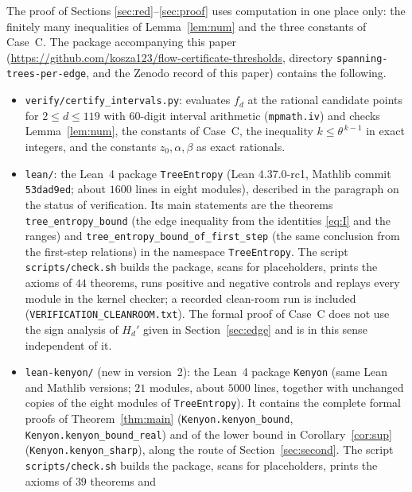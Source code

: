 \documentclass[11pt]{amsart}
\theoremstyle{plain}
\theoremstyle{remark}
\newcommand{\code}[1]{\texttt{#1}}
\newcommand{\tht}{\theta}
\begin{document}
The proof of Sections \ref{sec:red}--\ref{sec:proof} uses computation in one place only: the finitely many
inequalities of Lemma~\ref{lem:num} and the three constants of Case~C. The package accompanying this paper (\url{https://github.com/kosza123/flow-certificate-thresholds}, directory \code{spanning-trees-per-edge}, and the Zenodo record of this paper) contains the following.
\begin{itemize}
\item \code{verify/certify\_intervals.py}: evaluates $f_d$ at the rational candidate points for $2\le d\le119$ with
  $60$-digit interval arithmetic (\code{mpmath.iv}) and checks Lemma~\ref{lem:num}, the constants of Case~C, the
  inequality $k\le\tht^{\,k-1}$ in exact integers, and the constants $z_0,\alpha,\beta$ as exact rationals.
  
\item \begin{sloppypar}\code{lean/}: the Lean~4 package \code{TreeEntropy} (Lean 4.37.0-rc1, Mathlib commit
  \code{53dad9ed}; about $1600$ lines in eight modules), described in the paragraph on the status of
  verification. Its main statements are the theorems \code{tree\_entropy\_bound} (the edge inequality from the
  identities \eqref{eq:I} and the ranges) and \code{tree\_entropy\_bound\_of\_first\_step} (the same conclusion
  from the first-step relations) in the namespace \code{TreeEntropy}. The script \code{scripts/check.sh} builds the
  package, scans for placeholders, prints the axioms of $44$ theorems, runs positive and negative controls and
  replays every module in the kernel checker; a recorded clean-room run is included
  (\code{VERIFICATION\_CLEANROOM.txt}). The formal proof of Case~C does not use the sign analysis of $H_d'$ given
  in Section~\ref{sec:edge} and is in this sense independent of it.\end{sloppypar}
\item \begin{sloppypar}\code{lean-kenyon/} (new in version~2): the Lean~4 package \code{Kenyon} (same Lean and
  Mathlib versions; $21$ modules, about $5000$ lines, together with unchanged copies of the eight modules of
  \code{TreeEntropy}). It contains the complete formal proofs of Theorem~\ref{thm:main}
  (\code{Kenyon.kenyon\_bound}, \code{Kenyon.kenyon\_bound\_real}) and of the lower bound in
  Corollary~\ref{cor:sup} (\code{Kenyon.kenyon\_sharp}), along the route of Section~\ref{sec:second}. The script
  \code{scripts/check.sh} builds the package, scans for placeholders, prints the axioms of $39$ theorems and

\end{sloppypar}
\end{itemize}
\end{document}
